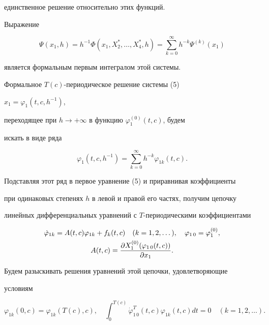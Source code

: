 единственное решение относительно этих функций. 


 


Выражение 


\begin{equation} 


\Psi(x_1,h)=h^{-1}\Phi(x_1,X^*_2,\dotsc,X^*_4,h)= 


\sum^\infty_{k=0}h^{-k}\Psi^{(k)}(x_1) 


\end{equation} 


является формальным первым интегралом этой системы. 


 


Формальное $T(c)$-периодическое решение системы (5) 


$x_1=\varphi_1(t,c,h^{-1})$, 


переходящее при $h\to+\infty$ в функцию $\varphi^{(0)}_1(t,c)$, будем 


искать в виде ряда 


\begin{equation} 


\varphi_1(t,c,h^{-1})=\sum^\infty_{k=0}h^{-k} 


\varphi_{1k}(t,c). 


\end{equation} 


Подставляя этот ряд в первое уравнение (5) и приравнивая коэффициенты 


при одинаковых степенях $h$ в левой и правой его частях, получим цепочку 


линейных дифференциальных уравнений с $T$-периодическими коэффициентами 


\begin{gather} 


\Dot\varphi_{1k}=A(t,c)\varphi_{1k}+f_k(t,c)\quad 


(k=1,2,\dotsc),\quad \varphi_{1\,0}=\varphi^{(0)}_1, \\ 


A(t,c)=\frac{\partial X^{(0)}_1(\varphi_{1\,0}(t,c))} 


{\partial x_1}.\notag 


\end{gather} 


Будем разыскивать решения уравнений этой цепочки, удовлетворяющие 


условиям 


\begin{equation} 


\varphi_{1k}(0,c)=\varphi_{1k}(T(c),c),\quad 


\int^{T(c)}_0 \Dot\varphi_{1\,0}^T(t,c)\varphi_{1k}(t,c)dt=0 


\quad (k=1,2,\dotsc). 


\end{equation} 



